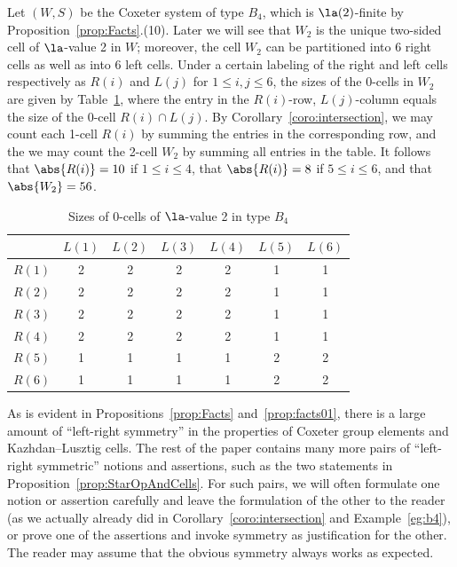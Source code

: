 \begin{example}
    \label{eg:b4}
    Let $(W,S)$ be the Coxeter system of type $B_4$, which is $\la(2)$-finite by
    Proposition~\ref{prop:Facts}.(10). Later we will see that $W_2$ is the unique two-sided cell of $\la$-value
    2 in $W$; moreover, the cell $W_2$ can be partitioned into 6 right cells as well as into 6 left
    cells. Under a certain labeling of the right and left cells respectively as $R(i)$ and $L(j)$
    for $1\le i,j\le 6$, the sizes of the 0-cells in $W_2$ are given by Table~\ref{tab:b4example}, where
    the entry in the $R(i)$-row, $L(j)$-column equals the size of the 0-cell $R(i)\cap L(j)$. By
    Corollary~\ref{coro:intersection}, we may count each 1-cell $R(i)$ by summing the entries in the
    corresponding row, and the we may count the 2-cell $W_2$ by summing all entries in the table.
    It follows that $\abs{R(i)}=10$ if $1\le i\le 4$, that $\abs{R(i)}=8$ if $5\le i\le 6$, and that
    $\abs{W_2}=56$.
    \begin{table} \centering
        \begin{tabular}{|c|c|c|c|c|c|c|} \hline & $L(1)$ & $L(2)$ & $L(3)$ & $L(4)$ & $L(5)$ &
              $L(6)$\\\hline $R(1)$ & 2& 2&  2 & 2 &  1&  1\\\hline $R(2)$ & 2& 2&  2 & 2 &  1&
              1\\\hline $R(3)$ & 2& 2&  2 & 2 & 1&  1\\\hline $R(4)$ & 2& 2&  2 & 2 &  1&  1\\\hline
              $R(5)$ & 1& 1&  1 & 1 &  2&  2\\\hline $R(6)$ & 1& 1&  1 & 1 &  2&  2\\\hline
        \end{tabular} \vspace{1em} \caption{Sizes of 0-cells of $\la$-value 2 in type $B_4$}
        \label{tab:b4example}
    \end{table}
\end{example}

\begin{remark}[Symmetry]
    \label{rmk:symmetry}
    As is evident in Propositions~\ref{prop:Facts} and~\ref{prop:facts01}, there is a large amount
    of ``left-right symmetry'' in the properties of Coxeter group elements and Kazhdan--Lusztig
    cells.  The rest of the paper contains many more pairs of ``left-right symmetric'' notions and
    assertions, such as the two statements in Proposition~\ref{prop:StarOpAndCells}. For such pairs, we will
    often formulate one notion or assertion carefully and leave the formulation of the other to the
    reader (as we actually already did in Corollary~\ref{coro:intersection} and Example~\ref{eg:b4}), or prove one
    of the assertions and invoke symmetry as justification for the other.  The reader may assume
    that the obvious symmetry always works as expected. 
\end{remark}

